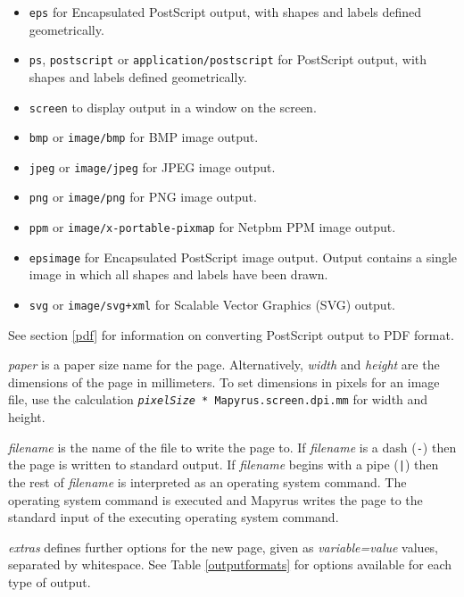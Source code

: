 \begin{itemize}
\item
\texttt{eps} for Encapsulated PostScript output,
with shapes and labels defined geometrically.
\item
\texttt{ps}, \texttt{postscript} or \texttt{application/postscript}
for PostScript output,
with shapes and labels defined geometrically.
\item
\texttt{screen} to display output in a window on the screen.
\item
\texttt{bmp} or \texttt{image/bmp} for BMP image output.
\item
\texttt{jpeg} or \texttt{image/jpeg} for JPEG image output.
\item
\texttt{png} or \texttt{image/png} for PNG image output.
\item
\texttt{ppm} or \texttt{image/x-portable-pixmap} for Netpbm PPM image output.
\item
\texttt{epsimage} for Encapsulated PostScript image output.
Output contains
a single image in which all shapes and labels have been drawn.
\item
\texttt{svg} or \texttt{image/svg+xml} for Scalable Vector Graphics
(SVG) output.
\end{itemize}

See section \ref{pdf} for
information on converting PostScript output to PDF format.

\textit{paper} is a paper size name for the page.
Alternatively, \textit{width} and \textit{height} are the dimensions of the page
in millimeters.  To set dimensions in pixels for an image file,
use the calculation
\texttt{\textit{pixelSize} * Mapyrus.screen.dpi.mm} for
width and height.

\textit{filename} is the name of the file to write the page to.
If \textit{filename} is a dash (\texttt{-})
then the page is written to standard output.
If \textit{filename} begins with a pipe (\texttt{|}) then the rest
of \textit{filename} is interpreted as an operating system
command.  The operating system command is executed and Mapyrus
writes the page to the standard input of the executing
operating system command.

\textit{extras} defines further options for the new page, given as
\textit{variable=value} values, separated by whitespace.
See Table \ref{outputformats}
for options available for each type of output.

